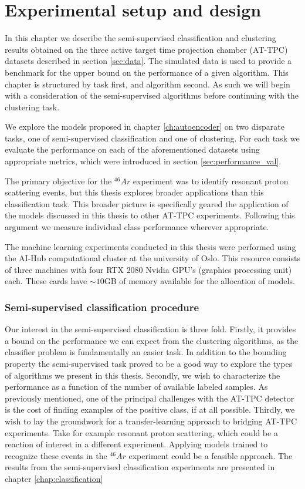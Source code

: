 \chapter{Experimental setup and design}

In this chapter we describe the semi-supervised classification and clustering results obtained on the three active target time projection chamber (AT-TPC) datasets described in section \ref{sec:data}. The simulated data is used to provide a benchmark for the upper bound on the performance of a given algorithm. This chapter is structured by task first, and algorithm second. As such we will begin with a consideration of the semi-supervised algorithms before continuing with the clustering task. 

 We explore the models proposed in chapter \ref{ch:autoencoder} on two disparate tasks, one of semi-supervised classification and one of clustering. For each task  we evaluate the performance on each of the aforementioned datasets using appropriate metrics, which were introduced in section \ref{sec:performance_val}. 

 The primary objective for the ${}^{46}Ar$ experiment was to identify resonant proton scattering events, but this thesis explores broader applications than this classification task. This broader picture is specifically geared the application of the models discussed in this thesis to other AT-TPC experiments. Following this argument we measure individual class performance wherever appropriate. 

The machine learning experiments conducted in this thesis were performed using the AI-Hub computational cluster at the university of Oslo.  This resource consists of three machines with four RTX $2080$ Nvidia GPU's (graphics processing unit) each. These cards have $\sim 10$GB of memory available for the allocation of models.

\subsection{Semi-supervised classification procedure}

Our interest in the semi-supervised classification is three fold. Firstly, it provides a bound on the performance we can expect from the clustering algorithms, as the classifier problem is fundamentally an easier task. In addition to the bounding property the semi-supervised task proved to be a good way to explore the types of algorithms we present in this thesis. Secondly, we wish to characterize the performance as a function of the number of available labeled samples. As previously mentioned, one of the principal challenges with the AT-TPC detector is the cost of finding examples of the positive class, if at all possible. Thirdly, we wish to lay the groundwork for a transfer-learning approach to bridging AT-TPC experiments. Take for example resonant proton scattering, which could be a reaction of interest in a different experiment. Applying models trained to recognize these events in the ${}^{46}Ar$ experiment could be a feasible approach. The results from the semi-supervised classification experiments are presented in chapter \ref{chap:classification}

